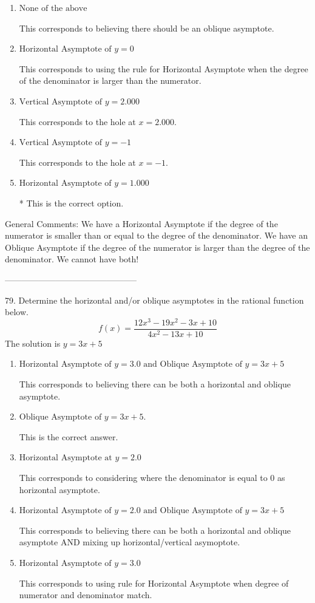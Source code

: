\documentclass{extbook}[14pt]
\begin{document}
\begin{enumerate}[label=\Alph*.] 
\item $ \text{None of the above} $ 

 This corresponds to believing there should be an oblique asymptote. 
\item $ \text{Horizontal Asymptote of } y = 0  $ 

 This corresponds to using the rule for Horizontal Asymptote when the degree of the denominator is larger than the numerator. 
\item $ \text{Vertical Asymptote of } y = 2.000  $ 

 This corresponds to the hole at $x = 2.000$. 
\item $ \text{Vertical Asymptote of } y = -1  $ 

 This corresponds to the hole at $x = -1$. 
\item $ \text{Horizontal Asymptote of } y = 1.000  $ 

 * This is the correct option. 
\end{enumerate} 
 
General Comments: We have a Horizontal Asymptote if the degree of the numerator is smaller than or equal to the degree of the denominator. We have an Oblique Asymptote if the degree of the numerator is larger than the degree of the denominator. We cannot have both!

-----------------------------------------------

79. Determine the horizontal and/or oblique asymptotes in the rational function below.
\[ f(x) = \frac{12x^{3} -19 x^{2} -3 x + 10}{4x^{2} -13 x + 10} \] 
The solution is $ y = 3x + 5 $ 

\begin{enumerate}[label=\Alph*.] 
\item $ \text{Horizontal Asymptote of } y = 3.0 \text{ and Oblique Asymptote of } y = 3x + 5 $ 

 This corresponds to believing there can be both a horizontal and oblique asymptote. 
\item $ \text{Oblique Asymptote of } y = 3x + 5. $ 

 This is the correct answer. 
\item $ \text{Horizontal Asymptote at } y = 2.0 $ 

 This corresponds to considering where the denominator is equal to 0 as horizontal asymptote. 
\item $ \text{Horizontal Asymptote of } y = 2.0 \text{ and Oblique Asymptote of } y = 3x + 5 $ 

 This corresponds to believing there can be both a horizontal and oblique asymptote AND mixing up horizontal/vertical asymoptote. 
\item $ \text{Horizontal Asymptote of } y = 3.0  $ 

 This corresponds to using rule for Horizontal Asymptote when degree of numerator and denominator match. 
\end{enumerate} 
 
\end{document}
